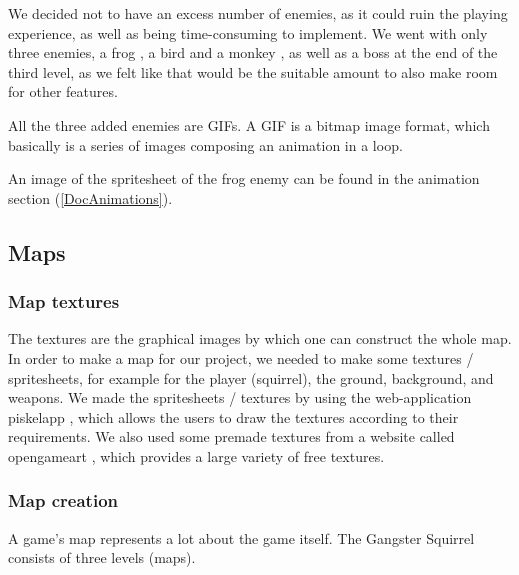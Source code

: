 \documentclass[12p]{article}
\begin{document}
We decided not to have an excess number of enemies, as it could ruin the playing experience, as well as being time-consuming to implement. We went with only three enemies, a frog \cite{FrogEnemyDesign}, a bird \cite{BirdEnemyDesign} and a monkey \cite{MonkeyEnemyDesign}, as well as a boss \cite{BossEnemyDesign} at the end of the third level, as we felt like that would be the suitable amount to also make room for other features. 

All the three added enemies are GIFs. A GIF is a bitmap image format, which basically is a series of images composing an animation in a loop.

An image of the spritesheet of the frog enemy can be found in the animation section (\ref{DocAnimations}).

\subsection{Maps} \label{VisualDocMaps}

\subsubsection{Map textures}

The textures are the graphical images by which one can construct the whole map. In order to make a map for our project, we needed to make some textures / spritesheets, for example for the player (squirrel), the ground, background, and weapons. We made the spritesheets / textures by using the web-application piskelapp \cite{piskelapp}, which allows the users to draw the textures according to their requirements. We also used some premade textures from a website called opengameart \cite{opengameart}, which provides a large variety of free textures.

\subsubsection{Map creation}

A game's map represents a lot about the game itself. The Gangster Squirrel consists of three levels (maps).
\end{document}
